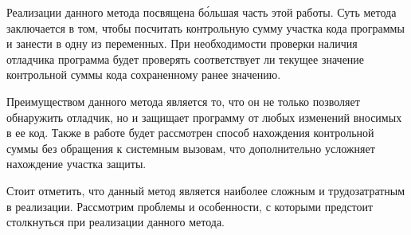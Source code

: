 Реализации данного метода посвящена б\'{о}льшая часть этой работы. Суть метода
заключается в том, чтобы посчитать контрольную сумму участка кода программы и
занести в одну из переменных. При необходимости проверки наличия отладчика
программа будет проверять соответствует ли текущее значение контрольной суммы
кода сохраненному ранее значению. 

Преимуществом данного метода является то, что он не только позволяет обнаружить
отладчик, но и защищает программу от любых изменений вносимых в ее код. Также
в работе будет рассмотрен способ нахождения контрольной суммы без обращения к
системным вызовам, что дополнительно усложняет нахождение участка защиты.

Стоит отметить, что данный метод является наиболее сложным и трудозатратным в
реализации. Рассмотрим проблемы и особенности, с которыми предстоит столкнуться
при реализации данного метода.
